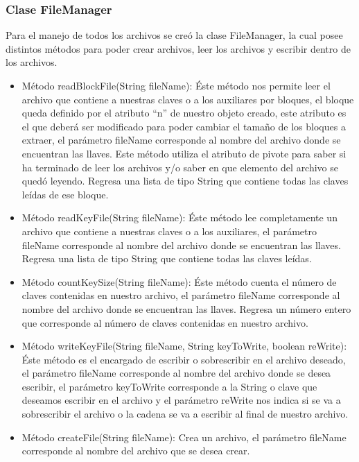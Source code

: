 \documentclass[11pt]{article}
\begin{document}
\subsubsection{Clase FileManager}
\par
Para el manejo de todos los archivos se creó la clase FileManager, la cual posee distintos métodos para poder crear archivos, leer los archivos y escribir dentro de los archivos.
\begin{itemize}
\item Método readBlockFile(String fileName): Éste método nos permite leer el archivo que contiene a nuestras claves o a los auxiliares por bloques, el bloque queda definido por el atributo “n” de nuestro objeto creado, este atributo es el que deberá ser modificado para poder cambiar el tamaño de los bloques a extraer, el parámetro fileName corresponde al nombre del archivo donde se encuentran las llaves. Este método utiliza el atributo de pivote para saber si ha terminado de leer los archivos y/o saber en que elemento del archivo se quedó leyendo. Regresa una lista de tipo String que contiene todas las claves leídas de ese bloque.

\item Método readKeyFile(String fileName): Éste método lee completamente un archivo que contiene a nuestras claves o a los auxiliares, el parámetro fileName corresponde al nombre del archivo donde se encuentran las llaves. Regresa una lista de tipo String que contiene todas las claves leídas. 

\item Método countKeySize(String fileName): Éste método cuenta el número de claves contenidas en nuestro archivo, el parámetro fileName corresponde al nombre del archivo donde se encuentran las llaves. Regresa un número entero que corresponde al número de claves contenidas en nuestro archivo.

\item Método writeKeyFile(String fileName, String keyToWrite, boolean reWrite): Éste método es el encargado de escribir o sobrescribir en el archivo deseado, el parámetro fileName corresponde al nombre del archivo donde se desea escribir, el parámetro keyToWrite corresponde a la String o clave que deseamos escribir en el archivo y el parámetro reWrite nos indica si se va a sobrescribir el archivo o la cadena se va a escribir al final de nuestro archivo.

\item Método createFile(String fileName): Crea un archivo, el parámetro fileName corresponde al nombre del archivo que se desea crear.
\end{itemize}
\end{document}
